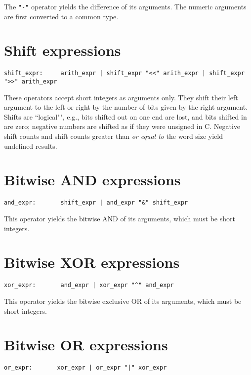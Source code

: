 The \verb|"-"| operator yields the difference of its arguments.
The numeric arguments are first converted to a common type.

\section{Shift expressions}

\begin{verbatim}
shift_expr:     arith_expr | shift_expr "<<" arith_expr | shift_expr ">>" arith_expr
\end{verbatim}

These operators accept short integers as arguments only.
They shift their left argument to the left or right by the number of bits
given by the right argument.  Shifts are ``logical"", e.g., bits shifted
out on one end are lost, and bits shifted in are zero;
negative numbers are shifted as if they were unsigned in C.
Negative shift counts and shift counts greater than {\em or equal to}
the word size yield undefined results.

\section{Bitwise AND expressions}

\begin{verbatim}
and_expr:       shift_expr | and_expr "&" shift_expr
\end{verbatim}

This operator yields the bitwise AND of its arguments,
which must be short integers.

\section{Bitwise XOR expressions}

\begin{verbatim}
xor_expr:       and_expr | xor_expr "^" and_expr
\end{verbatim}

This operator yields the bitwise exclusive OR of its arguments,
which must be short integers.

\section{Bitwise OR expressions}

\begin{verbatim}
or_expr:       xor_expr | or_expr "|" xor_expr
\end{verbatim}

